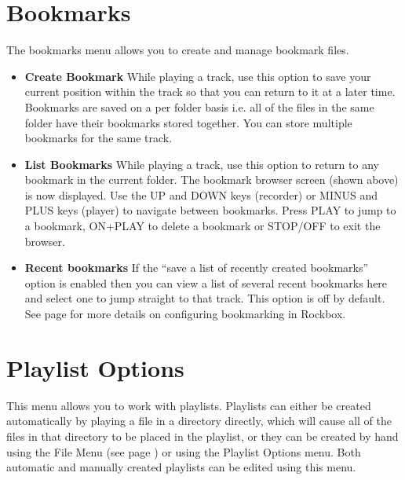 \section{\label{ref:Bookmarkconfig}\label{ref:Bookmarkmenu}Bookmarks}
The bookmarks menu allows you to create and manage bookmark files.

\begin{itemize}
  
\item \textbf{Create Bookmark}
  While playing a track, use this option to save your current position within the track so that you can return to it at a later time.  Bookmarks are saved on a per folder basis i.e. all of the files in the same folder have their bookmarks stored together. You can store multiple bookmarks for the same track.
  
\item \textbf{List Bookmarks}
  While playing a track, use this option to return to any bookmark in the current folder.  The bookmark browser screen (shown above) is now displayed.  Use the UP and DOWN keys (recorder) or MINUS and PLUS keys (player) to navigate between bookmarks.  Press PLAY to jump to a bookmark, ON+PLAY to delete a bookmark or STOP/OFF to exit the browser.
  
\item \textbf {Recent bookmarks}
  If the ``save a list of recently created bookmarks'' option is enabled then you can view a list of several recent bookmarks here and select one to jump straight to that track.  This option is off by default. See page \pageref{ref:Bookmarkconfigactual} for more details on configuring bookmarking in Rockbox.
\end{itemize}

\section{\label{ref:playlistoptions}Playlist Options}
This menu allows you to work with playlists. Playlists can either be created automatically by playing a file in a directory directly, which will cause all of the files in that directory to be placed in the playlist, or they can be created by hand using the File Menu (see page \pageref{ref:Filemenu}) or using the Playlist Options menu.  Both  automatic and manually created playlists can be edited using this menu.

